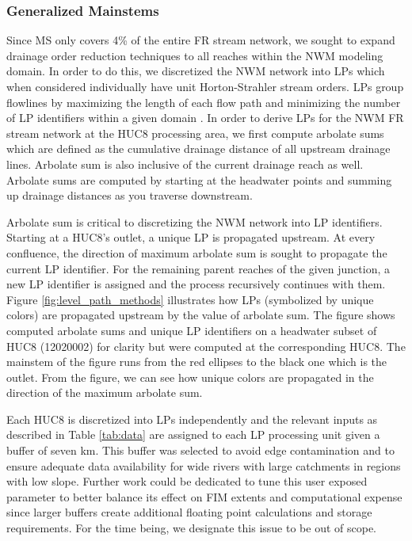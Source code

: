 \documentclass[draft]{dependencies/agujournal2019}
\begin{document}
\subsubsection{Generalized Mainstems}
\label{sssec:generalized_mainstems}
%
Since MS only covers 4\% of the entire FR stream network, we sought to expand drainage order reduction techniques to all reaches within the NWM modeling domain.
In order to do this, we discretized the NWM network into LPs which when considered individually have unit Horton-Strahler stream orders.
LPs group flowlines by maximizing the length of each flow path and minimizing the number of LP identifiers within a given domain \cite{moore2019user,mckay2012nhdplus}. 
In order to derive LPs for the NWM FR stream network at the HUC8 processing area, we first compute arbolate sums which are defined as the cumulative drainage distance of all upstream drainage lines.
Arbolate sum is also inclusive of the current drainage reach as well.
Arbolate sums are computed by starting at the headwater points and summing up drainage distances as you traverse downstream.

Arbolate sum is critical to discretizing the NWM network into LP identifiers.
Starting at a HUC8's outlet, a unique LP is propagated upstream. 
At every confluence, the direction of maximum arbolate sum is sought to propagate the current LP identifier.
For the remaining parent reaches of the given junction, a new LP identifier is assigned and the process recursively continues with them.
Figure \ref{fig:level_path_methods} illustrates how LPs (symbolized by unique colors) are propagated upstream by the value of arbolate sum.
The figure shows computed arbolate sums and unique LP identifiers on a headwater subset of HUC8 (12020002) for clarity but were computed at the corresponding HUC8.
The mainstem of the figure runs from the red ellipses to the black one which is the outlet.
From the figure, we can see how unique colors are propagated in the direction of the maximum arbolate sum.

Each HUC8 is discretized into LPs independently and the relevant inputs as described in Table \ref{tab:data} are assigned to each LP processing unit given a buffer of seven km.
This buffer was selected to avoid edge contamination \cite{lindsay2013measuring} and to ensure adequate data availability for wide rivers with large catchments in regions with low slope.
Further work could be dedicated to tune this user exposed parameter to better balance its effect on FIM extents and computational expense since larger buffers create additional floating point calculations and storage requirements.
For the time being, we designate this issue to be out of scope.
\end{document}
